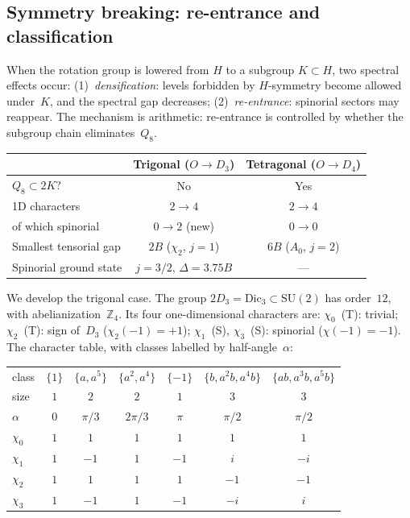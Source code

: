 \documentclass[12pt]{article}
\theoremstyle{definition}
\theoremstyle{remark}
\newcommand{\ZZ}{\mathbb{Z}}
\newcommand{\SU}{\mathrm{SU}}
\begin{document}
\subsection{Symmetry breaking: re-entrance and classification}
\label{sec:reentrance}

When the rotation group is lowered from $H$ to a subgroup
$K \subset H$, two spectral effects occur:
(1)~\emph{densification}: levels forbidden by $H$-symmetry
become allowed under~$K$, and the spectral gap decreases;
(2)~\emph{re-entrance}: spinorial sectors may reappear.
The mechanism is arithmetic: re-entrance is controlled by
whether the subgroup chain eliminates~$Q_8$.

\medskip
\begin{center}
\begin{tabular}{@{}lcc@{}}
  \toprule
  & Trigonal ($O \to D_3$) & Tetragonal ($O \to D_4$) \\
  \midrule
  $Q_8 \subset 2K$?     & No         & Yes        \\
  1D characters           & $2 \to 4$  & $2 \to 4$  \\
  \quad of which spinorial & $0 \to 2$ (new) & $0 \to 0$ \\
  Smallest tensorial gap  & $2B$ ($\chi_2$, $j{=}1$)
                          & $6B$ ($A_0$, $j{=}2$) \\
  Spinorial ground state  & $j{=}3/2$, $\Delta{=}3.75B$ & --- \\
  \bottomrule
\end{tabular}
\end{center}

\medskip
\noindent
We develop the trigonal case.
The group $2D_3 = \mathrm{Dic}_3 \subset \SU(2)$ has
order~$12$, with abelianization~$\ZZ_4$.
Its four one-dimensional characters are:
$\chi_0$~(T): trivial; $\chi_2$~(T): sign of~$D_3$
($\chi_2(-1) = +1$); $\chi_1$~(S), $\chi_3$~(S): spinorial
($\chi(-1) = -1$).
The character table, with classes labelled by
half-angle~$\alpha$:

\begin{center}
\begin{tabular}{@{}lcccccc@{}}
  \toprule
  class
    & $\{1\}$ & $\{a,a^5\}$ & $\{a^2,a^4\}$
    & $\{-1\}$ & $\{b,a^2b,a^4b\}$ & $\{ab,a^3b,a^5b\}$ \\
  size & $1$ & $2$ & $2$ & $1$ & $3$ & $3$ \\
  $\alpha$ & $0$ & $\pi/3$ & $2\pi/3$ & $\pi$
    & $\pi/2$ & $\pi/2$ \\
  \midrule
  $\chi_0$ & $1$ & $1$  & $1$  & $1$  & $1$  & $1$  \\
  $\chi_1$ & $1$ & $-1$ & $1$  & $-1$ & $i$  & $-i$ \\
  $\chi_2$ & $1$ & $1$  & $1$  & $1$  & $-1$ & $-1$ \\
  $\chi_3$ & $1$ & $-1$ & $1$  & $-1$ & $-i$ & $i$  \\
  \bottomrule
\end{tabular}
\end{center}
\end{document}
